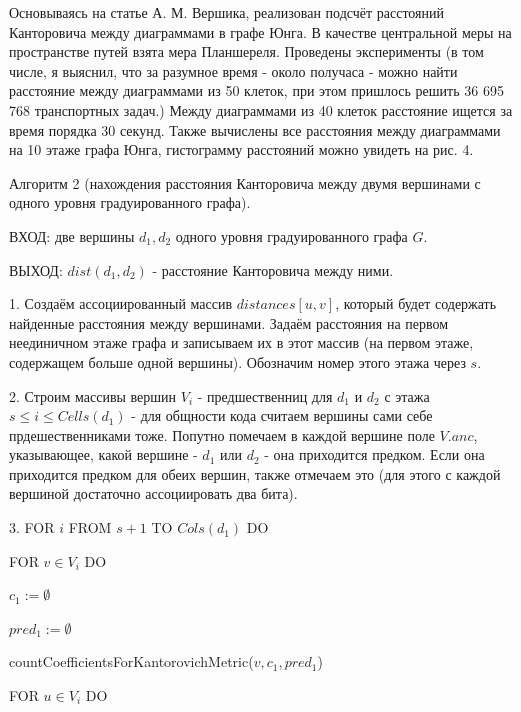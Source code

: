 \documentclass[12pt]{report}
\begin{document}
\hspace{\parindent} Основываясь на статье А. М. Вершика, реализован подсчёт расстояний Канторовича между диаграммами в графе Юнга. В качестве центральной меры на пространстве путей взята мера Планшереля. Проведены эксперименты (в том числе, я выяснил, что за разумное время - около получаса - можно найти расстояние между диаграммами из 50 клеток, при этом пришлось решить 36 695 768 транспортных задач.) Между диаграммами из 40 клеток расстояние ищется за время порядка 30 секунд. Также вычислены все расстояния между диаграммами на 10 этаже графа Юнга, гистограмму расстояний можно увидеть на рис. 4.

\vspace{1cm}

Алгоритм 2 (нахождения расстояния Канторовича между двумя вершинами с одного уровня градуированного графа).

ВХОД: две вершины $d_1, d_2$ одного уровня градуированного графа $G$.

ВЫХОД: $dist(d_1, d_2)$ - расстояние Канторовича между ними.

1. Создаём ассоциированный массив $distances[u, v]$, который будет содержать найденные расстояния между вершинами. Задаём расстояния на первом неединичном этаже графа и записываем их в этот массив (на первом этаже, содержащем больше одной вершины). Обозначим номер этого этажа через $s$.

2. Строим массивы вершин $V_i$ - предшественниц для $d_1$ и  $d_2$ с этажа $s \le i \le Cells(d_1)$ - для общности кода считаем вершины сами себе прдешественниками тоже. Попутно помечаем в каждой вершине поле $V.anc$, указывающее, какой вершине - $d_1$ или $d_2$ - она приходится предком. Если она приходится предком для обеих вершин, также отмечаем это (для этого с каждой вершиной достаточно ассоциировать два бита). 

3. FOR $i$ FROM $s + 1$ TO $Cols(d_1)$ DO

\hspace{1cm} FOR $v \in V_i$ DO

\hspace{2cm} $c_1 := \emptyset$

\hspace{2cm} $pred_1 := \emptyset$

\hspace{2cm} countCoefficientsForKantorovichMetric($v, c_1, pred_1$)

\hspace{2cm} FOR $u \in V_i$ DO
\end{document}
